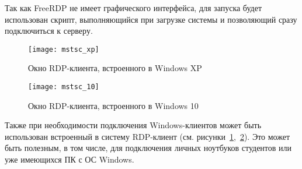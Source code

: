 Так как FreeRDP не имеет графического интерфейса, для запуска будет использован скрипт,
выполняющийся при загрузке системы и позволяющий сразу подключиться к серверу. 

\begin{figure}[p]
    \center
    \texttt{[image: mstsc\_xp]}
    \caption{Окно RDP-клиента, встроенного в Windows XP}
    \label{pic:mstsc_xp}
\end{figure}

\begin{figure}[p]
    \center
    \texttt{[image: mstsc\_10]}
    \caption{Окно RDP-клиента, встроенного в Windows 10}
    \label{pic:mstsc_10}
\end{figure}

Также при необходимости подключения Windows-клиентов может быть использован встроенный в
систему RDP-клиент (см. рисунки~\ref{pic:mstsc_xp},~\ref{pic:mstsc_10}). Это может быть
полезным, в том числе, для подключения личных ноутбуков студентов или уже имеющихся ПК
с ОС Windows.

